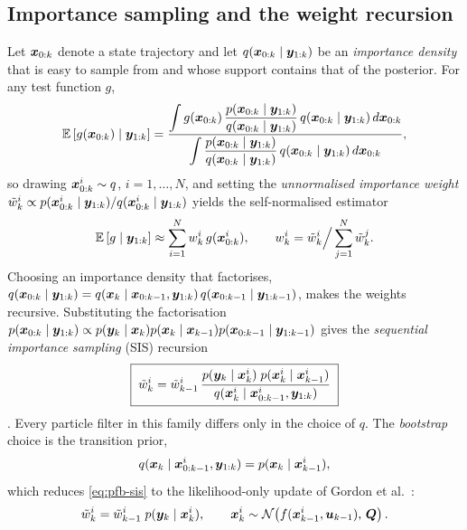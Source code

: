 \subsection{Importance sampling and the weight recursion}
Let $\bm{x}_{0:k}$ denote a state trajectory and let $q(\bm{x}_{0:k}\mid\bm{y}_{1:k})$ be an
\emph{importance density} that is easy to sample from and whose support contains that of the
posterior.  For any test function $g$,
\begin{equation}
  \mathbb{E}\left[g(\bm{x}_{0:k}) \mid \bm{y}_{1:k}\right]
  = \frac{\displaystyle\int g(\bm{x}_{0:k})\,
          \frac{p(\bm{x}_{0:k}\mid\bm{y}_{1:k})}{q(\bm{x}_{0:k}\mid\bm{y}_{1:k})}\, q(\bm{x}_{0:k}\mid\bm{y}_{1:k})\, d\bm{x}_{0:k}}
         {\displaystyle\int \frac{p(\bm{x}_{0:k}\mid\bm{y}_{1:k})}{q(\bm{x}_{0:k}\mid\bm{y}_{1:k})}\, q(\bm{x}_{0:k}\mid\bm{y}_{1:k})\, d\bm{x}_{0:k}},
  \label{eq:pfb-is}
\end{equation}
so drawing $\bm{x}_{0:k}^i \sim q$, $i = 1,\dots,N$, and setting the \emph{unnormalised importance
weight} $\tilde w_k^i \propto p(\bm{x}_{0:k}^i\mid\bm{y}_{1:k}) / q(\bm{x}_{0:k}^i\mid\bm{y}_{1:k})$ yields the
self-normalised estimator
\begin{equation}
  \mathbb{E}\left[g \mid \bm{y}_{1:k}\right] \approx \sum_{i=1}^{N} w_k^i\, g(\bm{x}_{0:k}^i),
  \qquad w_k^i = \tilde w_k^i \Big/ \sum_{j=1}^{N} \tilde w_k^j .
  \label{eq:pfb-selfnorm}
\end{equation}
Choosing an importance density that factorises,
$q(\bm{x}_{0:k}\mid\bm{y}_{1:k}) = q(\bm{x}_k \mid \bm{x}_{0:k-1},\bm{y}_{1:k})\, q(\bm{x}_{0:k-1}\mid\bm{y}_{1:k-1})$,
makes the weights recursive.  Substituting the factorisation
$p(\bm{x}_{0:k}\mid\bm{y}_{1:k}) \propto p(\bm{y}_k\mid\bm{x}_k) p(\bm{x}_k\mid\bm{x}_{k-1}) p(\bm{x}_{0:k-1}\mid\bm{y}_{1:k-1})$
gives the \emph{sequential importance sampling} (SIS) recursion
\begin{equation}
  \boxed{\;
  \tilde w_k^i = \tilde w_{k-1}^i \,
    \frac{p(\bm{y}_k \mid \bm{x}_k^i)\; p(\bm{x}_k^i \mid \bm{x}_{k-1}^i)}
         {q(\bm{x}_k^i \mid \bm{x}_{0:k-1}^i, \bm{y}_{1:k})} \; }
  \label{eq:pfb-sis}
\end{equation}
\cite[eq.~(47)]{arulampalam2002}.  Every particle filter in this family differs only in the choice
of $q$.  The \emph{bootstrap} choice is the transition prior,
\begin{equation}
  q(\bm{x}_k \mid \bm{x}_{0:k-1}^i, \bm{y}_{1:k}) = p(\bm{x}_k \mid \bm{x}_{k-1}^i),
  \label{eq:pfb-prior-proposal}
\end{equation}
which reduces \eqref{eq:pfb-sis} to the likelihood-only update of Gordon et al.\
\cite[eq.~(12)]{gordon1993}:
\begin{equation}
  \tilde w_k^i = \tilde w_{k-1}^i \; p(\bm{y}_k \mid \bm{x}_k^i),
  \qquad
  \bm{x}_k^i \sim \mathcal{N}\!\left(f(\bm{x}_{k-1}^i,\bm{u}_{k-1}),\,\bm{Q}\right).
  \label{eq:pfb-boot}
\end{equation}
